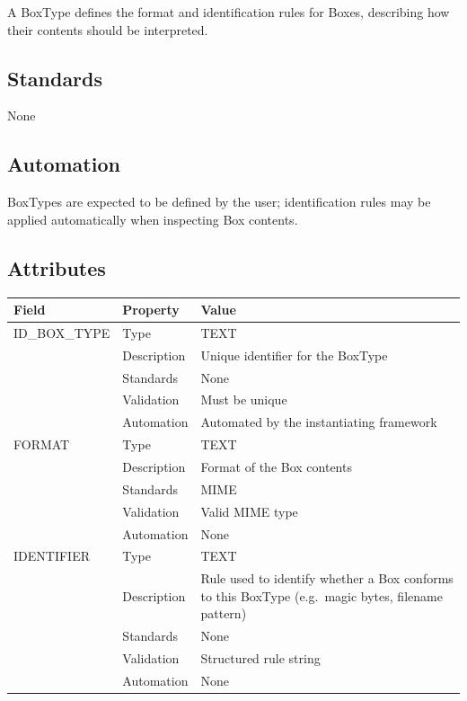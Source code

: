 A BoxType defines the format and identification rules for Boxes,
describing how their contents should be interpreted.

\subsection{Standards}\label{standards-7}

None

\subsection{Automation}\label{automation-7}

BoxTypes are expected to be defined by the user; identification rules
may be applied automatically when inspecting Box contents.

\subsection{Attributes}\label{attributes-7}

\begin{longtable}[]{@{}
  >{\raggedright\arraybackslash}p{}
  >{\raggedright\arraybackslash}p{}
  >{\raggedright\arraybackslash}p{}@{}}
\toprule\noalign{}
\begin{minipage}[b]{\linewidth}\raggedright
Field
\end{minipage} & \begin{minipage}[b]{\linewidth}\raggedright
Property
\end{minipage} & \begin{minipage}[b]{\linewidth}\raggedright
Value
\end{minipage} \\
\midrule\noalign{}
\endhead
\bottomrule\noalign{}
\endlastfoot
ID\_BOX\_TYPE & Type & TEXT \\
& Description & Unique identifier for the BoxType \\
& Standards & None \\
& Validation & Must be unique \\
& Automation & Automated by the instantiating framework \\
FORMAT & Type & TEXT \\
& Description & Format of the Box contents \\
& Standards & MIME \\
& Validation & Valid MIME type \\
& Automation & None \\
IDENTIFIER & Type & TEXT \\
& Description & Rule used to identify whether a Box conforms to this
BoxType (e.g.~magic bytes, filename pattern) \\
& Standards & None \\
& Validation & Structured rule string \\
& Automation & None \\
\end{longtable}

